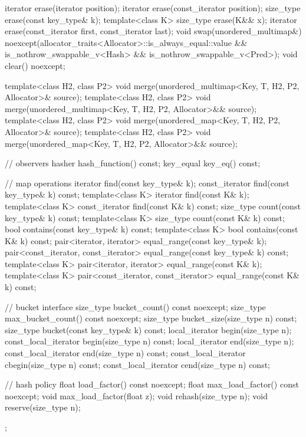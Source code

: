 \begin{codeblock}
{{    iterator  erase(iterator position);
    iterator  erase(const_iterator position);
    size_type erase(const key_type& k);
    template<class K> size_type erase(K&& x);
    iterator  erase(const_iterator first, const_iterator last);
    void      swap(unordered_multimap&)
      noexcept(allocator_traits<Allocator>::is_always_equal::value &&
               is_nothrow_swappable_v<Hash> &&
               is_nothrow_swappable_v<Pred>);
    void      clear() noexcept;

    template<class H2, class P2>
      void merge(unordered_multimap<Key, T, H2, P2, Allocator>& source);
    template<class H2, class P2>
      void merge(unordered_multimap<Key, T, H2, P2, Allocator>&& source);
    template<class H2, class P2>
      void merge(unordered_map<Key, T, H2, P2, Allocator>& source);
    template<class H2, class P2>
      void merge(unordered_map<Key, T, H2, P2, Allocator>&& source);

    // observers
    hasher hash_function() const;
    key_equal key_eq() const;

    // map operations
    iterator         find(const key_type& k);
    const_iterator   find(const key_type& k) const;
    template<class K>
      iterator       find(const K& k);
    template<class K>
      const_iterator find(const K& k) const;
    size_type        count(const key_type& k) const;
    template<class K>
      size_type      count(const K& k) const;
    bool             contains(const key_type& k) const;
    template<class K>
      bool           contains(const K& k) const;
    pair<iterator, iterator>               equal_range(const key_type& k);
    pair<const_iterator, const_iterator>   equal_range(const key_type& k) const;
    template<class K>
      pair<iterator, iterator>             equal_range(const K& k);
    template<class K>
      pair<const_iterator, const_iterator> equal_range(const K& k) const;

    // bucket interface
    size_type bucket_count() const noexcept;
    size_type max_bucket_count() const noexcept;
    size_type bucket_size(size_type n) const;
    size_type bucket(const key_type& k) const;
    local_iterator begin(size_type n);
    const_local_iterator begin(size_type n) const;
    local_iterator end(size_type n);
    const_local_iterator end(size_type n) const;
    const_local_iterator cbegin(size_type n) const;
    const_local_iterator cend(size_type n) const;

    // hash policy
    float load_factor() const noexcept;
    float max_load_factor() const noexcept;
    void max_load_factor(float z);
    void rehash(size_type n);
    void reserve(size_type n);
  };

}
\end{codeblock}
